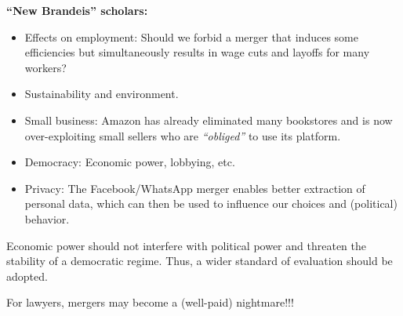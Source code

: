             \noindent
            \textbf{“New Brandeis” scholars:}
            \begin{itemize}
                \item Effects on employment: Should we forbid a merger that induces some efficiencies but simultaneously results in wage cuts and layoffs for many workers?
                \item Sustainability and environment.
                \item Small business: Amazon has already eliminated many bookstores and is now over-exploiting small sellers who are \textit{“obliged”} to use its platform.
                \item Democracy: Economic power, lobbying, etc.
                \item Privacy: The Facebook/WhatsApp merger enables better extraction of personal data, which can then be used to influence our choices and (political) behavior.
            \end{itemize}
            
            \noindent
            Economic power should not interfere with political power and threaten the stability of a democratic regime. Thus, a wider standard of evaluation should be adopted.


            \noindent
            For lawyers, mergers may become a (well-paid) nightmare!!!
            
